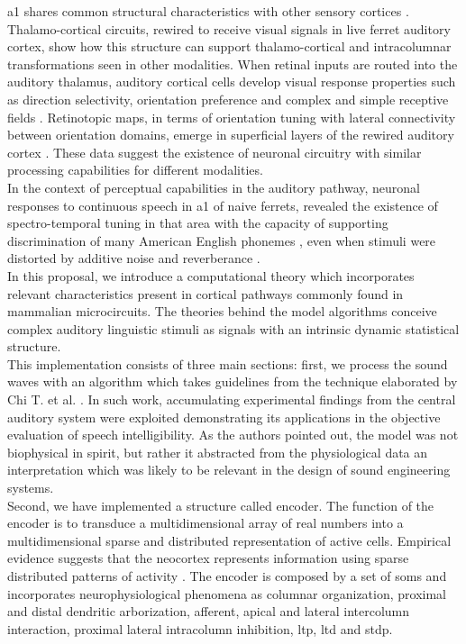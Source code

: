 \documentclass[11pt,a4paper]{article}
\begin{document}
\gls{a1} shares common structural
characteristics with other sensory cortices
\cite{huang_2000, winer_1992, rockel_1980, mitani_1985, mitani_1985A}.
Thalamo-cortical circuits, rewired to receive
visual signals in live ferret auditory cortex,
show how this structure can support
thalamo-cortical and intracolumnar transformations
seen in other modalities.
When retinal inputs are routed into the auditory thalamus,
auditory cortical cells develop visual response properties
such as direction selectivity,
orientation preference and
complex and simple receptive fields
\cite{sur_1988, angelucci_1998, roe_1992}.
Retinotopic maps, in terms of orientation tuning with lateral connectivity between
orientation domains, emerge in superficial layers of the rewired
auditory cortex \cite{roe_1990, sur_2000}.
These data suggest the existence of neuronal circuitry
with similar processing capabilities for different modalities.\\

In the context of perceptual capabilities in 
the auditory pathway,
neuronal responses to continuous speech in
\gls{a1} of naive ferrets,
revealed the existence of spectro-temporal tuning
in that area with the capacity of supporting discrimination
of many American English phonemes \cite{mesgarani_2008},
even when stimuli were distorted by additive noise and
reverberance \cite{mesgarani_2014A}.\\

In this proposal, we introduce a computational
theory which incorporates relevant
characteristics present in cortical pathways commonly found in mammalian
microcircuits. The theories behind the model algorithms conceive complex
auditory linguistic stimuli as signals with an intrinsic dynamic statistical
structure. \\

This implementation consists of three main sections:
first, we process the sound waves with an algorithm
which takes guidelines from
the technique elaborated by Chi T. et al. \cite{chi_2005}.
In such work, accumulating experimental findings
from the central auditory system
were exploited demonstrating its applications in the objective
evaluation of speech intelligibility.
As the authors pointed out, the model was not biophysical in spirit,
but rather it abstracted from the physiological data an interpretation
which was likely to be relevant in the design of sound engineering systems. \\

Second, we have implemented a structure called encoder.
The function of the encoder is to transduce a multidimensional
array of real numbers into a multidimensional sparse and distributed representation of
active cells. Empirical evidence suggests that the neocortex represents 
information using sparse distributed patterns of activity \cite{barth_2012}.
The encoder is composed by a set of \glspl{som} \cite{kohonen_2082, Kohonen:1989:SAM:69371}
and incorporates neurophysiological phenomena as columnar organization, proximal and distal
dendritic arborization, afferent, apical and lateral intercolumn interaction, proximal
lateral intracolumn inhibition, \gls{ltp}, \gls{ltd} and \gls{stdp}. \\
\end{document}
